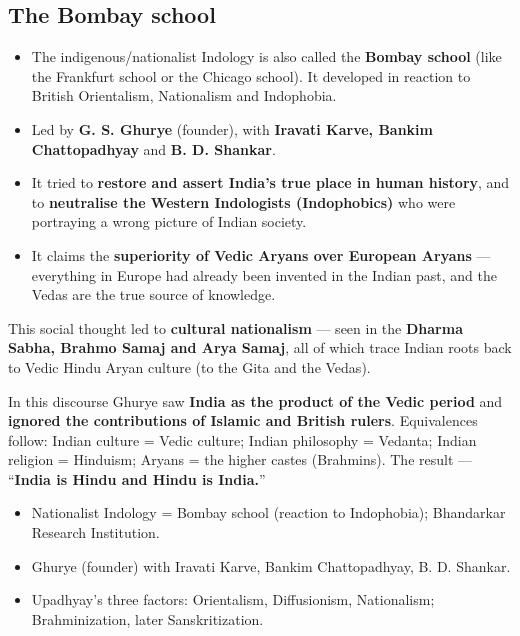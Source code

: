 \subsection{The Bombay school}

\begin{itemize}
\item The indigenous/nationalist Indology is also called the \textbf{Bombay school} (like the Frankfurt school or the Chicago school). It developed in reaction to British Orientalism, Nationalism and Indophobia.
\item Led by \textbf{G. S. Ghurye} (founder), with \textbf{Iravati Karve, Bankim Chattopadhyay} and \textbf{B. D. Shankar}.
\item It tried to \textbf{restore and assert India's true place in human history}, and to \textbf{neutralise the Western Indologists (Indophobics)} who were portraying a wrong picture of Indian society.
\item It claims the \textbf{superiority of Vedic Aryans over European Aryans} --- everything in Europe had already been invented in the Indian past, and the Vedas are the true source of knowledge.
\end{itemize}

This social thought led to \textbf{cultural nationalism} --- seen in the \textbf{Dharma Sabha, Brahmo Samaj and Arya Samaj}, all of which trace Indian roots back to Vedic Hindu Aryan culture (to the Gita and the Vedas).

\begin{CriticalPoint}
In this discourse Ghurye saw \textbf{India as the product of the Vedic period} and \textbf{ignored the contributions of Islamic and British rulers}. Equivalences follow: Indian culture = Vedic culture; Indian philosophy = Vedanta; Indian religion = Hinduism; Aryans = the higher castes (Brahmins). The result --- ``\textbf{India is Hindu and Hindu is India.}''
\end{CriticalPoint}

\begin{QuickRevision}
\begin{itemize}
\item Nationalist Indology = Bombay school (reaction to Indophobia); Bhandarkar Research Institution.
\item Ghurye (founder) with Iravati Karve, Bankim Chattopadhyay, B. D. Shankar.
\item Upadhyay's three factors: Orientalism, Diffusionism, Nationalism; Brahminization, later Sanskritization.
\end{itemize}
\end{QuickRevision}


